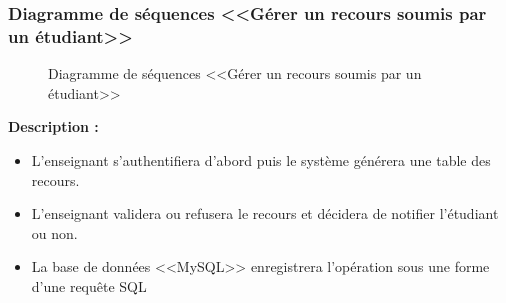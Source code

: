 \documentclass[12pt]{report}
\begin{document}
\newpage

\subsubsection{Diagramme de séquences <<Gérer un recours soumis par un étudiant>>}

\begin{figure}[h]
\centering
    \centerline{}
    \caption{Diagramme de séquences <<Gérer un recours soumis par un étudiant>>}
\end{figure}

\textbf{Description :}

\begin{itemize}
    \item L'enseignant s'authentifiera d'abord puis le système générera une table des recours.
    \item L'enseignant validera ou refusera le recours et décidera de notifier l'étudiant ou non.
    \item La base de données <<MySQL>> enregistrera l'opération sous une forme d'une requête SQL
\end{itemize}
\end{document}
